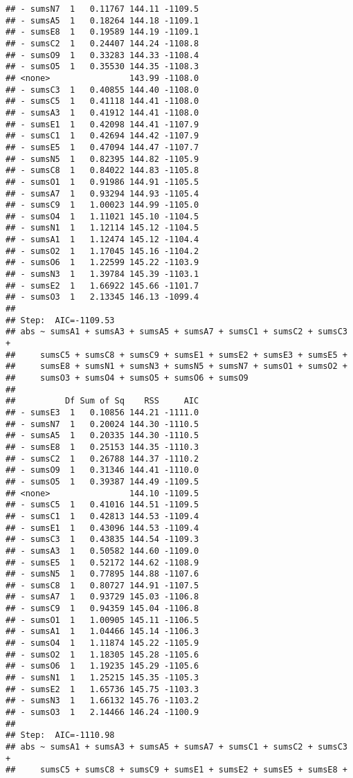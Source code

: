 \documentclass[,man,floatsintext]{apa6}
\begin{document}
\begin{verbatim}
## - sumsN7  1   0.11767 144.11 -1109.5
## - sumsA5  1   0.18264 144.18 -1109.1
## - sumsE8  1   0.19589 144.19 -1109.1
## - sumsC2  1   0.24407 144.24 -1108.8
## - sumsO9  1   0.33283 144.33 -1108.4
## - sumsO5  1   0.35530 144.35 -1108.3
## <none>                143.99 -1108.0
## - sumsC3  1   0.40855 144.40 -1108.0
## - sumsC5  1   0.41118 144.41 -1108.0
## - sumsA3  1   0.41912 144.41 -1108.0
## - sumsE1  1   0.42098 144.41 -1107.9
## - sumsC1  1   0.42694 144.42 -1107.9
## - sumsE5  1   0.47094 144.47 -1107.7
## - sumsN5  1   0.82395 144.82 -1105.9
## - sumsC8  1   0.84022 144.83 -1105.8
## - sumsO1  1   0.91986 144.91 -1105.5
## - sumsA7  1   0.93294 144.93 -1105.4
## - sumsC9  1   1.00023 144.99 -1105.0
## - sumsO4  1   1.11021 145.10 -1104.5
## - sumsN1  1   1.12114 145.12 -1104.5
## - sumsA1  1   1.12474 145.12 -1104.4
## - sumsO2  1   1.17045 145.16 -1104.2
## - sumsO6  1   1.22599 145.22 -1103.9
## - sumsN3  1   1.39784 145.39 -1103.1
## - sumsE2  1   1.66922 145.66 -1101.7
## - sumsO3  1   2.13345 146.13 -1099.4
## 
## Step:  AIC=-1109.53
## abs ~ sumsA1 + sumsA3 + sumsA5 + sumsA7 + sumsC1 + sumsC2 + sumsC3 + 
##     sumsC5 + sumsC8 + sumsC9 + sumsE1 + sumsE2 + sumsE3 + sumsE5 + 
##     sumsE8 + sumsN1 + sumsN3 + sumsN5 + sumsN7 + sumsO1 + sumsO2 + 
##     sumsO3 + sumsO4 + sumsO5 + sumsO6 + sumsO9
## 
##          Df Sum of Sq    RSS     AIC
## - sumsE3  1   0.10856 144.21 -1111.0
## - sumsN7  1   0.20024 144.30 -1110.5
## - sumsA5  1   0.20335 144.30 -1110.5
## - sumsE8  1   0.25153 144.35 -1110.3
## - sumsC2  1   0.26788 144.37 -1110.2
## - sumsO9  1   0.31346 144.41 -1110.0
## - sumsO5  1   0.39387 144.49 -1109.5
## <none>                144.10 -1109.5
## - sumsC5  1   0.41016 144.51 -1109.5
## - sumsC1  1   0.42813 144.53 -1109.4
## - sumsE1  1   0.43096 144.53 -1109.4
## - sumsC3  1   0.43835 144.54 -1109.3
## - sumsA3  1   0.50582 144.60 -1109.0
## - sumsE5  1   0.52172 144.62 -1108.9
## - sumsN5  1   0.77895 144.88 -1107.6
## - sumsC8  1   0.80727 144.91 -1107.5
## - sumsA7  1   0.93729 145.03 -1106.8
## - sumsC9  1   0.94359 145.04 -1106.8
## - sumsO1  1   1.00905 145.11 -1106.5
## - sumsA1  1   1.04466 145.14 -1106.3
## - sumsO4  1   1.11874 145.22 -1105.9
## - sumsO2  1   1.18305 145.28 -1105.6
## - sumsO6  1   1.19235 145.29 -1105.6
## - sumsN1  1   1.25215 145.35 -1105.3
## - sumsE2  1   1.65736 145.75 -1103.3
## - sumsN3  1   1.66132 145.76 -1103.2
## - sumsO3  1   2.14466 146.24 -1100.9
## 
## Step:  AIC=-1110.98
## abs ~ sumsA1 + sumsA3 + sumsA5 + sumsA7 + sumsC1 + sumsC2 + sumsC3 + 
##     sumsC5 + sumsC8 + sumsC9 + sumsE1 + sumsE2 + sumsE5 + sumsE8 + 

\end{verbatim}
\end{document}
